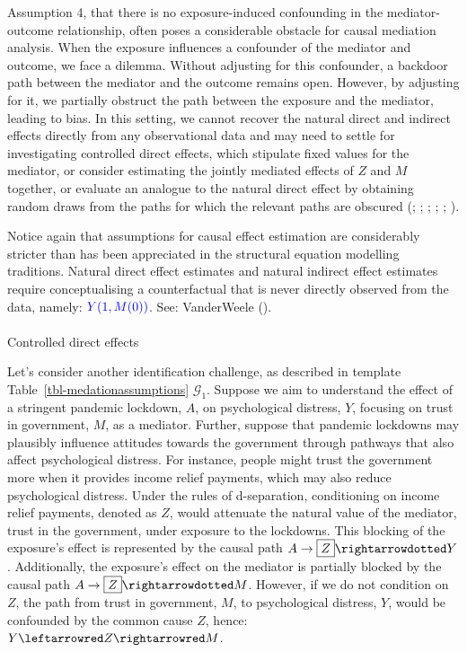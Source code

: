\documentclass[
  single column]{article}
\makeatletter
\let\oldparagraph\paragraph
\renewcommand{\paragraph}{
    \@ifstar
      \xxxParagraphStar
      \xxxParagraphNoStar
  }
\newcommand{\xxxParagraphStar}[1]{\oldparagraph*{#1}\mbox{}}
\newcommand{\xxxParagraphNoStar}[1]{\oldparagraph{#1}\mbox{}}
\makeatother
\begin{document}
Assumption 4, that there is no exposure-induced confounding in the
mediator-outcome relationship, often poses a considerable obstacle for
causal mediation analysis. When the exposure influences a confounder of
the mediator and outcome, we face a dilemma. Without adjusting for this
confounder, a backdoor path between the mediator and the outcome remains
open. However, by adjusting for it, we partially obstruct the path
between the exposure and the mediator, leading to bias. In this setting,
we cannot recover the natural direct and indirect effects directly from
any observational data and may need to settle for investigating
controlled direct effects, which stipulate fixed values for the
mediator, or consider estimating the jointly mediated effects of \(Z\)
and \(M\) together, or evaluate an analogue to the natural direct effect
by obtaining random draws from the paths for which the relevant paths
are obscured (;
;
;
;
; ).

Notice again that assumptions for causal effect estimation are
considerably stricter than has been appreciated in the structural
equation modelling traditions. Natural direct effect estimates and
natural indirect effect estimates require conceptualising a
counterfactual that is never directly observed from the data, namely:
\(\textcolor{blue}{Y(1, M(0))}\). See: VanderWeele
().

\paragraph{Controlled direct effects}\label{controlled-direct-effects}

Let's consider another identification challenge, as described in
template Table~\ref{tbl-medationassumptions} \(\mathcal{G}_1\). Suppose
we aim to understand the effect of a stringent pandemic lockdown, \(A\),
on psychological distress, \(Y\), focusing on trust in government,
\(M\), as a mediator. Further, suppose that pandemic lockdowns may
plausibly influence attitudes towards the government through pathways
that also affect psychological distress. For instance, people might
trust the government more when it provides income relief payments, which
may also reduce psychological distress. Under the rules of d-separation,
conditioning on income relief payments, denoted as \(Z\), would
attenuate the natural value of the mediator, trust in the government,
under exposure to the lockdowns. This blocking of the exposure's effect
is represented by the causal path
\(A \to \boxed{Z} \rightarrowdotted Y\). Additionally, the exposure's
effect on the mediator is partially blocked by the causal path
\(A \to \boxed{Z} \rightarrowdotted M\). However, if we do not condition
on \(Z\), the path from trust in government, \(M\), to psychological
distress, \(Y\), would be confounded by the common cause \(Z\), hence:
\(Y \leftarrowred Z \rightarrowred M\).
\end{document}

